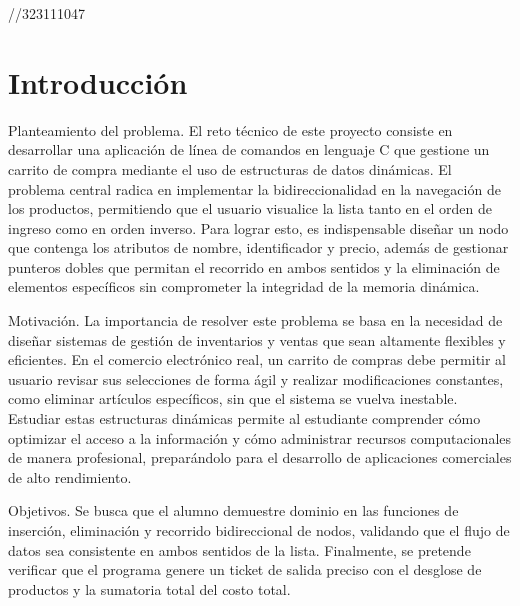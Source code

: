 //323111047

\section{Introducción}

Planteamiento del problema. El reto técnico de este proyecto consiste en desarrollar una aplicación de línea de comandos en lenguaje C que gestione un carrito de compra mediante el uso de estructuras de datos dinámicas. El problema central radica en implementar la bidireccionalidad en la navegación de los productos, permitiendo que el usuario visualice la lista tanto en el orden de ingreso como en orden inverso. Para lograr esto, es indispensable diseñar un nodo que contenga los atributos de nombre, identificador y precio, además de gestionar punteros dobles que permitan el recorrido en ambos sentidos y la eliminación de elementos específicos sin comprometer la integridad de la memoria dinámica.

\vspace{0.4cm}

Motivación. La importancia de resolver este problema se basa en la necesidad de diseñar sistemas de gestión de inventarios y ventas que sean altamente flexibles y eficientes. En el comercio electrónico real, un carrito de compras debe permitir al usuario revisar sus selecciones de forma ágil y realizar modificaciones constantes, como eliminar artículos específicos, sin que el sistema se vuelva inestable. Estudiar estas estructuras dinámicas permite al estudiante comprender cómo optimizar el acceso a la información y cómo administrar recursos computacionales de manera profesional, preparándolo para el desarrollo de aplicaciones comerciales de alto rendimiento.

\vspace{0.4cm}

Objetivos. Se busca que el alumno demuestre dominio en las funciones de inserción, eliminación y recorrido bidireccional de nodos, validando que el flujo de datos sea consistente en ambos sentidos de la lista. Finalmente, se pretende verificar que el programa genere un ticket de salida preciso con el desglose de productos y la sumatoria total del costo total.